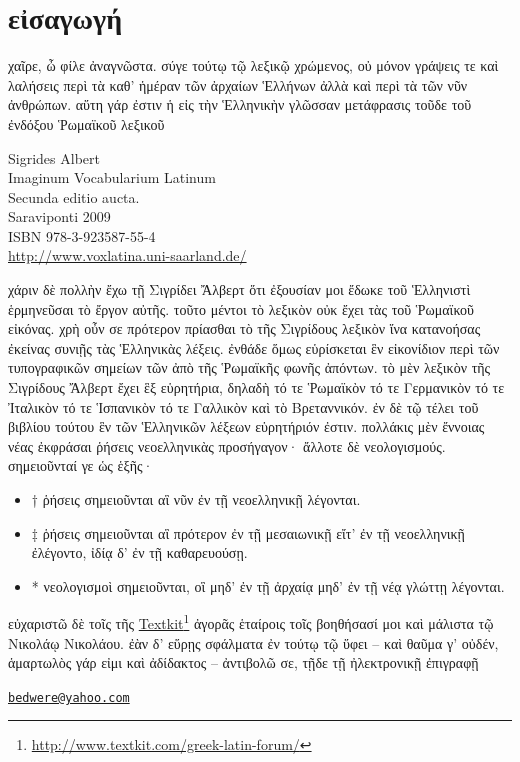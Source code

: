 \documentclass{book}
\begin{document}
\section*{εἰσαγωγή}
χαῖρε, ὦ φίλε ἀναγνῶστα. σύγε τούτῳ τῷ λεξικῷ χρώμενος, οὐ μόνον γράψεις τε καὶ
λαλήσεις περὶ τὰ καθ' ἡμέραν τῶν  ἀρχαίων Ἑλλήνων ἀλλὰ καὶ περὶ τὰ τῶν νῦν ἀνθρώπων. 
αὕτη γάρ ἐστιν ἡ εἰς τὴν Ἑλληνικὴν γλῶσσαν μετάφρασις τοῦδε τοῦ ἐνδόξου Ῥωμαϊκοῦ λεξικοῦ 
\begin{flushleft}
Sigrides Albert  \\
Imaginum Vocabularium Latinum  \\
Secunda editio aucta. \\
Saraviponti 2009 \\
ISBN 978-3-923587-55-4 \\
\url{http://www.voxlatina.uni-saarland.de/}
\end{flushleft}
χάριν δὲ πολλὴν ἔχω τῇ Σιγρίδει Ἄλβερτ ὅτι ἐξουσίαν  μοι ἔδωκε τοῦ Ἑλληνιστὶ
ἑρμηνεῦσαι τὸ ἔργον αὐτῆς.  τοῦτο  μέντοι τὸ λεξικὸν οὐκ ἔχει τὰς τοῦ Ῥωμαϊκοῦ 
εἰκόνας. χρὴ οὖν σε πρότερον πρίασθαι τὸ τῆς Σιγρίδους λεξικὸν ἵνα 
κατανοήσας ἐκείνας
 συνιῇς τὰς  Ἑλληνικὰς λέξεις.  ἐνθάδε ὅμως εὑρίσκεται ἓν εἰκονίδιον  περὶ τῶν  τυπογραφικῶν σημείων τῶν ἀπὸ τῆς Ῥωμαϊκῆς φωνῆς ἀπόντων.  
τὸ μὲν λεξικὸν τῆς Σιγρίδους Ἄλβερτ ἔχει ἓξ εὑρητήρια, δηλαδὴ 
 τό τε Ῥωμαϊκὸν τό τε Γερμανικὸν τό τε
Ἰταλικὸν τό τε Ἱσπανικὸν τό τε Γαλλικὸν καὶ τὸ Βρεταννικόν.
 ἐν δὲ τῷ τέλει τοῦ βιβλίου τούτου ἓν 
τῶν Ἑλληνικῶν λέξεων
εὑρητήριόν ἐστιν.  
πολλάκις μὲν ἔννοιας νέας ἐκφράσαι ῥήσεις νεοελληνικὰς προσήγαγον· ἄλλοτε δὲ νεολογισμούς. σημειοῦνταί γε ὡς ἑξῆς·
\begin{itemize}
\item † ῥήσεις σημειοῦνται αἳ νῦν ἐν τῇ νεοελληνικῇ λέγονται.
\item ‡ ῥήσεις σημειοῦνται αἳ πρότερον ἐν τῇ μεσαιωνικῇ εἴτ' ἐν τῇ νεοελληνικῇ ἐλέγοντο, ἰδίᾳ δ' ἐν τῇ καθαρευούσῃ.
\item * νεολογισμοὶ σημειοῦνται, οἳ μηδ' ἐν τῇ ἀρχαίᾳ μηδ' ἐν τῇ νέᾳ γλώττῃ λέγονται.
\end{itemize}
εὐχαριστῶ δὲ τοῖς  τῆς
\href{http://www.textkit.com/greek-latin-forum/}{Textkit}\footnote{\url{http://www.textkit.com/greek-latin-forum/}} ἀγορᾶς
ἑταίροις τοῖς βοηθήσασί μοι καὶ μάλιστα τῷ  Νικολάῳ Νικολάου. ἐὰν δ' εὕρῃς 
σφάλματα
ἐν τούτῳ τῷ ὕφει -- καὶ θαῦμα γ' οὐδέν, ἁμαρτωλὸς γάρ εἰμι καὶ ἀδίδακτος --
  ἀντιβολῶ σε, τῇδε τῇ ἠλεκτρονικῇ ἐπιγραφῇ  
\begin{flushleft}
\href{mailto:bedwere@yahoo.com}{\texttt{bedwere@yahoo.com}}
\end{flushleft}
\end{document}
